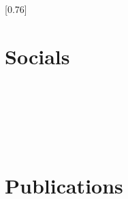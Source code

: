\documentclass[ats,jdlanctot]{mycv}
\begin{document}
\setlength{\columnsep}{1.2cm}
[0.76]
\begin{paracol}{2}

\paracolbackgroundoptions

\atsleftcolumnfont
{\setasidefontcolour
\flushleft
\vspace{-0.6em}

\begin{minipage}[t]{0.24\textwidth}
\section*{Socials}
\href{\myEmailHref}{%
}\\[0.6em]
\href{\myTwitterHref}{%
}\\[0.6em]
\href{\myLinkedInHref}{%
}\\[0.6em]
\href{\myGitHubHref}{%
}
\end{minipage}\\[1.2em]

\begin{minipage}[t]{0.24\textwidth}
\section*{Publications}
\href{\myGoogleScholarHref}{%
}\\[0.6em]
\href{\myOrchidHref}{%
}
\end{minipage}\\[0.5em]

}
\end{paracol}
\end{document}
